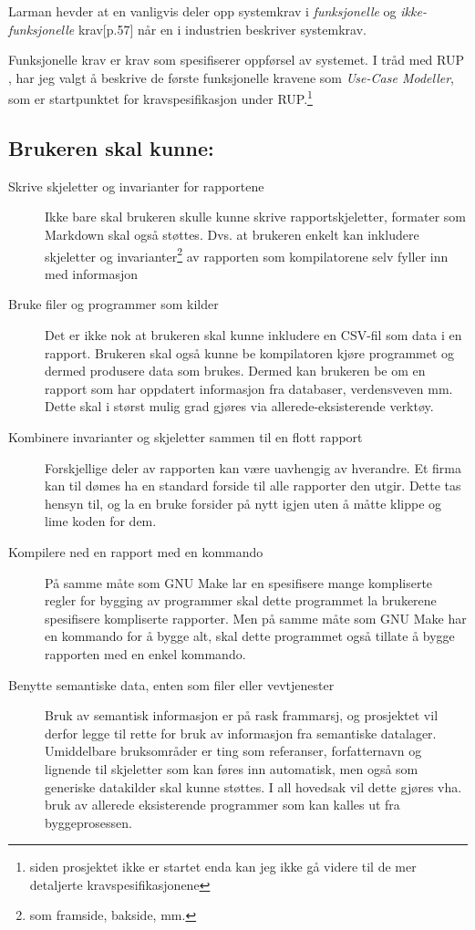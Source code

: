 \documentclass[11pt]{article}
\begin{document}
Larman hevder at en vanligvis deler opp systemkrav i \emph{funksjonelle} og \emph{ikke-funksjonelle} krav\cite{Larman2005}[p.57] når en i industrien beskriver systemkrav.

Funksjonelle krav er krav som spesifiserer oppførsel av systemet.
I tråd med RUP \cite{Larman2005} , har jeg valgt å beskrive de første funksjonelle kravene som \emph{Use-Case Modeller}, som er startpunktet for kravspesifikasjon under RUP.\footnote{siden prosjektet ikke er startet enda kan jeg ikke gå videre til de mer detaljerte kravspesifikasjonene}

\subsection{Brukeren skal kunne:}
\label{subsec:eval-brukerhistorier}
\begin{description}
\item [Skrive skjeletter og invarianter for rapportene]
  Ikke bare skal brukeren skulle kunne skrive rapportskjeletter,
  formater som Markdown skal også støttes.
  Dvs. at brukeren enkelt kan inkludere skjeletter og invarianter\footnote{som framside, bakside, mm.}
  av rapporten som kompilatorene selv fyller inn med informasjon
\item [Bruke filer og programmer som kilder]
  Det er ikke nok at brukeren skal kunne inkludere en CSV-fil som data i en rapport.
  Brukeren skal også kunne be kompilatoren kjøre programmet og dermed produsere data som brukes.
  Dermed kan brukeren be om en rapport som har oppdatert informasjon fra databaser, verdensveven mm.
  Dette skal i størst mulig grad gjøres via allerede-eksisterende verktøy.
\item [Kombinere invarianter og skjeletter sammen til en flott rapport]
  Forskjellige deler av rapporten kan være uavhengig av hverandre.
  Et firma kan til dømes ha en standard forside til alle rapporter den utgir.
  Dette tas hensyn til, og la en bruke forsider på nytt igjen uten å måtte klippe og lime koden for dem.
\item [Kompilere ned en rapport med en kommando]
  På samme måte som GNU Make\cite{GNU-MAKE} lar en spesifisere mange kompliserte regler
  for bygging av programmer skal dette programmet la brukerene spesifisere kompliserte rapporter.
  Men på samme måte som GNU Make har en kommando for å bygge alt,
  skal dette programmet også tillate å bygge rapporten med en enkel kommando.
\item [Benytte semantiske data, enten som filer eller vevtjenester]
  Bruk av semantisk informasjon er på rask frammarsj,
  og prosjektet vil derfor legge til rette for bruk av informasjon fra semantiske datalager.
  Umiddelbare bruksområder er ting som referanser, forfatternavn og lignende til skjeletter som kan føres inn automatisk, men også som generiske datakilder skal kunne støttes.
  I all hovedsak vil dette gjøres vha. bruk av allerede eksisterende programmer
  som kan kalles ut fra byggeprosessen.
\end{description}
\end{document}
